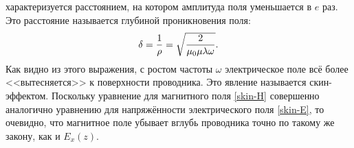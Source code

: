 характеризуется расстоянием, на котором амплитуда поля уменьшается в $e$ раз. Это расстояние называется глубиной
проникновения поля:
\begin{equation} \eqmark{20}
\delta=\frac{1}{\rho}=\sqrt{\frac{2}{\mu_0\mu\lambda\omega}}.
\end{equation}
Как видно из этого выражения, с ростом частоты $\omega$ электрическое поле всё более <<вытесняется>> к поверхности
проводника. Это явление называется скин-эффектом. Поскольку уравнение для магнитного поля \eqref{skin-H} совершенно аналогично
уравнению для напряжённости электрического поля \eqref{skin-E}, то очевидно, что магнитное поле убывает вглубь проводника
точно по такому же закону, как и $E_x(z)$.


